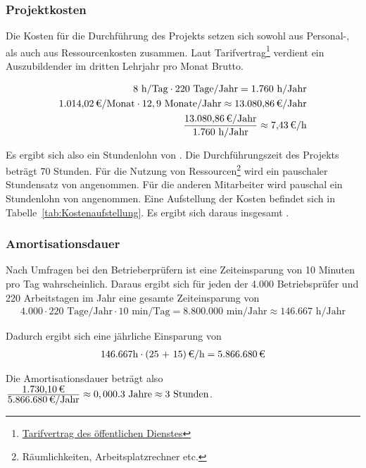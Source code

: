 \subsubsection{Projektkosten}
\label{sec:Projektkosten}

Die Kosten für die Durchführung des Projekts setzen sich sowohl aus Personal-, als auch aus Ressourcenkosten zusammen.
Laut Tarifvertrag\footnote{\href{http://oeffentlicher-dienst.info/tvoed/bund/azubi.html}{Tarifvertrag des öffentlichen Dienstes}} verdient ein Auszubildender im dritten Lehrjahr pro Monat  Brutto. 

\begin{eqnarray}
8 \mbox{ h/Tag} \cdot 220 \mbox{ Tage/Jahr} = 1.760 \mbox{ h/Jahr}\\
\eur{1.014,02}\mbox{/Monat} \cdot 12,9 \mbox{ Monate/Jahr} \approx \eur{13.080,86} \mbox{/Jahr}\\
\frac{\eur{13.080,86} \mbox{/Jahr}}{1.760 \mbox{ h/Jahr}} \approx \eur{7,43}\mbox{/h}
\end{eqnarray}

Es ergibt sich also ein Stundenlohn von . 
Die Durchführungszeit des Projekts beträgt 70 Stunden. Für die Nutzung von Ressourcen\footnote{Räumlichkeiten, Arbeitsplatzrechner etc.} wird 
ein pauschaler Stundensatz von  angenommen. Für die anderen Mitarbeiter wird pauschal ein Stundenlohn von  angenommen. 
Eine Aufstellung der Kosten befindet sich in Tabelle~\ref{tab:Kostenaufstellung}. Es ergibt sich daraus insgesamt .


\subsubsection{Amortisationsdauer}
\label{sec:Amortisationsdauer}

Nach Umfragen bei den Betrieberprüfern ist eine Zeiteinsparung von 10 Minuten pro Tag wahrscheinlich. Daraus ergibt sich für jeden der 4.000 Betriebsprüfer und 220 Arbeitstagen im Jahr eine gesamte Zeiteinsparung von 
\begin{eqnarray}
4.000 \cdot 220 \mbox{ Tage/Jahr} \cdot 10 \mbox{ min/Tag} = 8.800.000 \mbox{ min/Jahr} \approx 146.667 \mbox{ h/Jahr} 
\end{eqnarray}

Dadurch ergibt sich eine jährliche Einsparung von 
\begin{eqnarray}
146.667 \mbox{h} \cdot \eur{(25 + 15)}{\mbox{/h}} = \eur{5.866.680}
\end{eqnarray}

Die Amortisationsdauer beträgt also $\frac{\eur{1.730,10}}{\eur{5.866.680}\mbox{/Jahr}} \approx 0,000.3 \mbox{ Jahre} \approx 3 \mbox{ Stunden}$.

